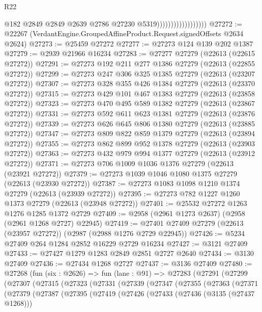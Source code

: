 \begin{lexlean}{R22}
\begin{coremodule}
                                        @182
                                        @2849
                                        @2849
                                        @2639
                                        @2786
                                        @27230
                                        @5319))))))))))))))))))
@27272 := @22267 (VerdantEngine.GroupedAffineProduct.Request.signedOffsets @2634 @2624)
@27273 := @25459 @27272
@27277 := @27273 @124 @139 @202 @1387
@27279 := @2939 @21966 @16234
@27283 := @27277 @27279 (@22613 (@22615 @27272))
@27291 := @27273 @192 @211 @277 @1386 @27279 (@22613 (@22855 @27272))
@27299 := @27273 @247 @306 @325 @1385 @27279 (@22613 (@23207 @27272))
@27307 := @27273 @328 @355 @426 @1384 @27279 (@22613 (@23370 @27272))
@27315 := @27273 @429 @101 @467 @1383 @27279 (@22613 (@23858 @27272))
@27323 := @27273 @470 @495 @589 @1382 @27279 (@22613 (@23867 @27272))
@27331 := @27273 @592 @611 @623 @1381 @27279 (@22613 (@23876 @27272))
@27339 := @27273 @626 @645 @806 @1380 @27279 (@22613 (@23885 @27272))
@27347 := @27273 @809 @822 @859 @1379 @27279 (@22613 (@23894 @27272))
@27355 := @27273 @862 @899 @952 @1378 @27279 (@22613 (@23903 @27272))
@27363 := @27273 @432 @979 @994 @1377 @27279 (@22613 (@23912 @27272))
@27371 := @27273 @706 @1009 @1036 @1376 @27279 (@22613 (@23921 @27272))
@27379 := @27273 @1039 @1046 @1080 @1375 @27279 (@22613 (@23930 @27272))
@27387 := @27273 @1083 @1098 @1210 @1374 @27279 (@22613 (@23939 @27272))
@27395 := @27273 @782 @1227 @1260 @1373 @27279 (@22613 (@23948 @27272))
@27401 := @25532 @27272 @1263 @1276 @1285 @1372 @2729
@27409 := @2958 (@2961 @1273 @2637) (@2958 (@2961 @1268 @2727) @22945)
@27419 := @27401 @27409 @27279 (@22613 (@23957 @27272)) (@2987 (@2988 @1276 @2729 @22945))
@27426 := @5234 @27409 @264 @1284 @2852 @16229 @2729 @16234
@27427 := @3121 @27409
@27433 := @27427 @1279 @1283 @2849 @2851 @2727 @2640
@27434 := @3130 @27409
@27436 := @27434 @1268 @2727
@27437 := @3136 @27409
@27480 := @27268
    (fun (six : @2626) =>
    fun (lane : @91) =>
    @27283
      (@27291
        (@27299
          (@27307
            (@27315
              (@27323
                (@27331
                  (@27339
                    (@27347
                      (@27355
                        (@27363
                          (@27371
                            (@27379
                              (@27387
                                (@27395
                                  (@27419
                                    (@27426
                                      (@27433
                                        (@27436 (@3135 (@27437 @1268)))

\end{coremodule}
\end{lexlean}

